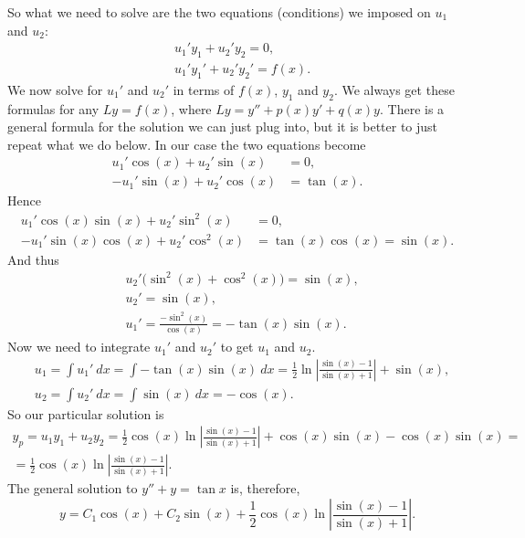 \documentclass[12pt]{book}
\begin{document}
So what we need to solve are the two equations (conditions) we imposed
on $u_1$ and $u_2$:
\begin{equation*}
\boxed{~~
\begin{aligned}
& u_1' y_1 + u_2' y_2 = 0 ,\\
& u_1' y_1' + u_2' y_2' = f(x) .
\end{aligned}
~~}
\end{equation*}
We now solve for $u_1'$ and $u_2'$ in terms of $f(x)$, $y_1$ and $y_2$.
We always get these formulas for any $Ly = f(x)$, where $Ly =
y''+p(x)y'+q(x)y$.  There is a general
formula for the solution we can just plug into, but it is better to
just repeat what we do below.  In our case the two equations become
\begin{align*}
u_1' \cos (x) + u_2' \sin (x) &= 0 ,\\
-u_1' \sin (x) + u_2' \cos (x) &= \tan (x) .
\end{align*}
Hence
\begin{align*}
u_1' \cos (x) \sin (x) + u_2' \sin^2 (x) & = 0 ,\\
-u_1' \sin (x) \cos (x) + u_2' \cos^2 (x) & = \tan (x) \cos (x) = \sin (x) .
\end{align*}
And thus
\begin{align*}
& u_2' \bigl(\sin^2 (x) + \cos^2 (x)\bigr) = \sin (x) , \\
& u_2' = \sin (x) , \\
& u_1' = \frac{- \sin^2 (x)}{\cos (x)} = - \tan (x) \sin (x) .
\end{align*}
Now we need to integrate $u_1'$ and $u_2'$ to get $u_1$ and $u_2$.
\begin{align*}
& u_1 = \int u_1'~dx 
= \int - \tan (x) \sin (x)~dx
= \frac{1}{2}
\ln \left\lvert \frac{\sin (x)-1}{\sin (x) + 1} \right\rvert
+ \sin (x) , \\
& u_2 = \int u_2'~dx 
= \int \sin (x)~dx = -\cos (x) .
\end{align*}
So our particular solution is
\begin{multline*}
y_p = u_1 y_1 + u_2 y_2 =
\frac{1}{2} \cos (x) \ln \left\lvert \frac{\sin (x)-1}{\sin (x) + 1}
\right\rvert
+ \cos (x) \sin (x)
-\cos (x) \sin (x)
= \\ =
\frac{1}{2} \cos (x) \ln \left\lvert \frac{\sin (x)-1}{\sin (x) + 1}
\right\rvert .
\end{multline*}
The general solution to $y'' + y = \tan x$ is, therefore,
\begin{equation*}
y = C_1 \cos (x) + C_2 \sin (x) +
\frac{1}{2} \cos (x) \ln \left\lvert \frac{\sin (x)-1}{\sin (x) + 1}
\right\rvert .
\end{equation*}
\end{document}
